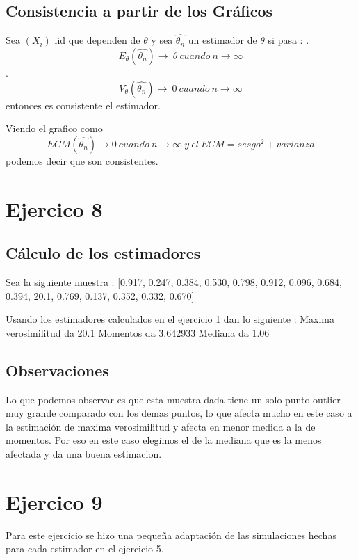 \documentclass[a4paper]{article}
\begin{document}
\subsection{Consistencia a partir de los Gráficos}
Sea  $(X_{i}) $ iid que dependen de $\theta$ y sea $\hat{\theta_{n}}$ un estimador de $\theta$ si pasa : . \[E_{\theta}{(\hat{\theta_{n}})} \rightarrow \ \theta \ cuando \ n \rightarrow \infty \] . \[V_{\theta}{(\hat{\theta_{n}})} \rightarrow \ 0 \ cuando \ n \rightarrow \infty \] \newline
entonces es consistente el estimador. \newline
  
Viendo el grafico como \[ECM(\hat{\theta_{n}}) \rightarrow 0 \ cuando \ n \rightarrow \infty \ y \ el\ ECM = sesgo^2 + varianza\] podemos decir que son consistentes. 

\section{Ejercico 8}
\subsection{Cálculo de los estimadores}
Sea la siguiente muestra : [0.917, 0.247, 0.384, 0.530, 0.798, 0.912, 0.096, 0.684, 0.394, 20.1, 0.769, 0.137, 0.352, 0.332, 0.670] \newline

Usando los estimadores calculados en el ejercicio 1 dan lo siguiente : \newline
Maxima verosimilitud da 20.1 \newline
Momentos da 3.642933 \newline
Mediana da 1.06 


\subsection{Observaciones}
Lo que podemos observar es que esta muestra dada tiene un solo punto outlier muy grande comparado con los demas puntos, lo que afecta mucho en este caso a la estimación de maxima verosimilitud y afecta en menor medida a la de momentos. Por eso en este caso elegimos el de la mediana que es la menos afectada y da una buena estimacion.
 
\section{Ejercico 9}
Para este ejercicio se hizo una pequeña adaptación de las simulaciones hechas para cada estimador en el ejercicio 5. 
\end{document}
